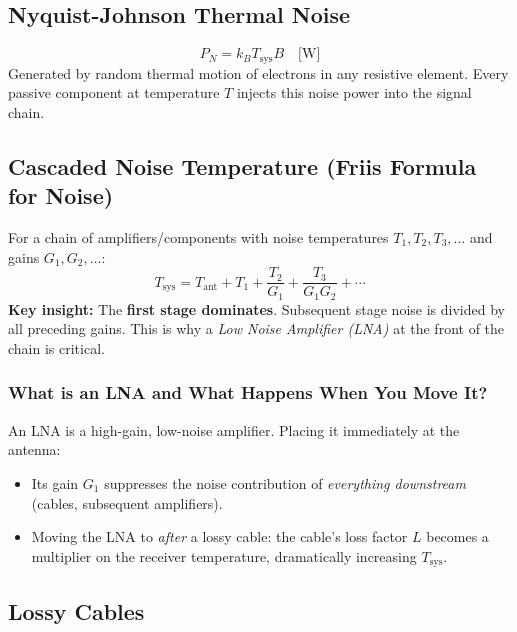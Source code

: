 \documentclass[10pt,letterpaper]{article}
\begin{document}
\subsection{Nyquist-Johnson Thermal Noise}

\begin{equation}
  P_N = k_B T_\mathrm{sys} B \quad \text{[W]}
\end{equation}
Generated by random thermal motion of electrons in any resistive element. Every passive component at temperature $T$ injects this noise power into the signal chain.

\subsection{Cascaded Noise Temperature (Friis Formula for Noise)}

\begin{tcolorbox}[formulabox, title={Cascaded System Noise Temperature}]
For a chain of amplifiers/components with noise temperatures $T_1, T_2, T_3, \ldots$ and gains $G_1, G_2, \ldots$:
\begin{equation}
  T_\mathrm{sys} = T_\mathrm{ant} + T_1 + \frac{T_2}{G_1} + \frac{T_3}{G_1 G_2} + \cdots
\end{equation}
\textbf{Key insight:} The \textbf{first stage dominates}. Subsequent stage noise is divided by all preceding gains. This is why a \emph{Low Noise Amplifier (LNA)} at the front of the chain is critical.
\end{tcolorbox}

\subsubsection{What is an LNA and What Happens When You Move It?}
An LNA is a high-gain, low-noise amplifier. Placing it immediately at the antenna:
\begin{itemize}[noitemsep]
  \item Its gain $G_1$ suppresses the noise contribution of \emph{everything downstream} (cables, subsequent amplifiers).
  \item Moving the LNA to \emph{after} a lossy cable: the cable's loss factor $L$ becomes a multiplier on the receiver temperature, dramatically increasing $T_\mathrm{sys}$.
\end{itemize}

\subsection{Lossy Cables}
\end{document}

